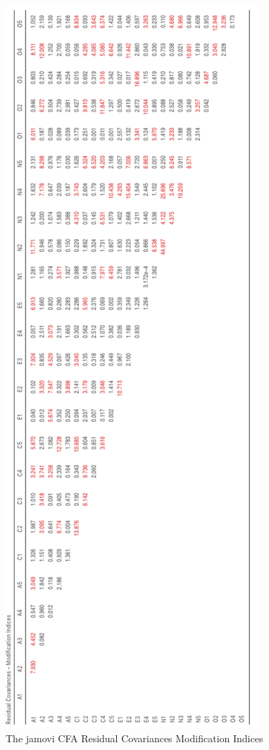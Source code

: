 \documentclass[
]{book}
\begin{document}
\begin{figure}

{\centering \includegraphics[width=1\linewidth]{img/factoranalysis/cfa7} 

}

\caption{The jamovi CFA Residual Covariances Modification Indices}\label{fig:cfa7}
\end{figure}
\end{document}

